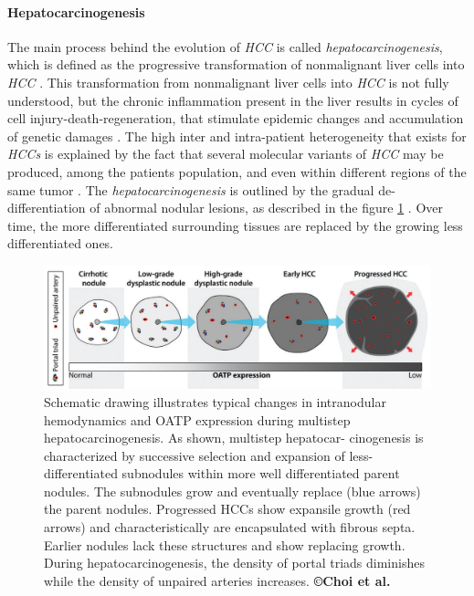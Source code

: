 \documentclass[]{article}
\let\oldparagraph\paragraph
\renewcommand{\paragraph}[1]{\oldparagraph{#1}\mbox{}}
\begin{document}
\paragraph{Hepatocarcinogenesis}\label{hepatocarcinogenesis}

The main process behind the evolution of \emph{HCC} is called
\emph{hepatocarcinogenesis}, which is
defined as the progressive transformation of nonmalignant liver cells
into \emph{HCC} \cite{Choi2014}. 
This transformation from nonmalignant liver cells into \emph{HCC} is not
fully understood, but the chronic inflammation present in the liver
results in cycles of cell injury-death-regeneration, that stimulate
epidemic changes and accumulation of genetic damages \cite{Thorgeirsson2002,Aravalli2013,Brody2012,Trevisani2008a}. 
The high inter and intra-patient heterogeneity that exists for
\emph{HCCs} is explained by the fact that several molecular variants of
\emph{HCC} may be produced, among the patients population, and even
within different regions of the same tumor \cite{Trevisani2008a,Frenette2011}.
The \emph{hepatocarcinogenesis} is outlined by the gradual
de-differentiation of abnormal nodular lesions, as described in the
figure \ref{Choi2014_Fig1} \cite{Park2011,Frenette2011}. Over time, the more
differentiated surrounding tissues are replaced by the growing less
differentiated ones.

\begin{figure}[ht!]
\centering
\includegraphics[width=0.5\linewidth]{images/image4}
\caption{Schematic drawing illustrates typical changes in intranodular hemodynamics and OATP expression during multistep hepatocarcinogenesis. As shown, multistep hepatocar- cinogenesis is characterized by successive selection and expansion of less-differentiated subnodules within more well differentiated parent nodules. The subnodules grow and eventually replace (blue arrows) the parent nodules. Progressed HCCs show expansile growth (red arrows) and characteristically are encapsulated with fibrous septa. Earlier nodules lack these structures and show replacing growth. During hepatocarcinogenesis, the density of portal triads diminishes while the density of unpaired arteries increases. \textbf{©Choi et al.} \cite{Choi2014}}
\label{Choi2014_Fig1}
\end{figure}
\end{document}
